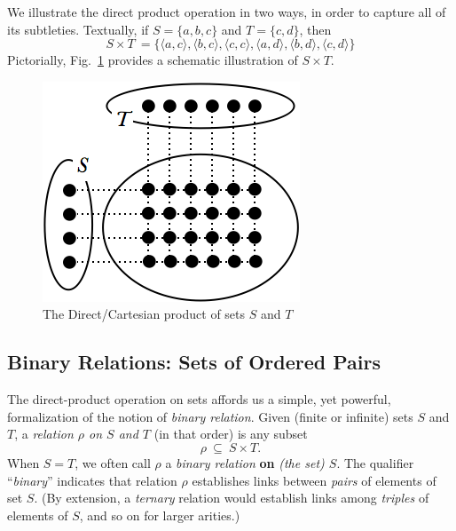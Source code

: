 \smallskip

We illustrate the direct product operation in two ways, in order to capture all of its subtleties. Textually, if $S = \{a,b,c\}$ and $T = \{c,d\}$, then
\[ S \times T \ =  \{
\langle a,c \rangle,
\langle b,c \rangle,
\langle c,c \rangle,
\langle a,d \rangle,
\langle b,d \rangle,
\langle c,d \rangle\}
\]
Pictorially, Fig.~\ref{fig:cartesianproduct} provides a schematic illustration of $S \times T$.
\begin{figure}[htb]
\begin{center}
        \includegraphics[scale=0.4]{FiguresMaths/cartesianProduct}
        \caption{The Direct/Cartesian product of sets $S$ and $T$}
        \label{fig:cartesianproduct}
\end{center}
\end{figure}

\subsection{Binary Relations: Sets of Ordered Pairs}
\label{sec:relation}

  
The direct-product operation on sets affords us a simple, yet powerful, formalization of the  notion of {\em binary relation}.  Given (finite or infinite) sets $S$ and $T$, a {\it relation $\rho$ on $S$ and $T$} (in that order) is any subset
\[ \rho \ \subseteq \ S \times T. \]
When $S = T$, we often call $\rho$ a {\em binary relation} {\bf on} {\em (the set) $S$}.  The qualifier ``{\em binary}'' indicates that relation $\rho$ establishes links between {\em pairs} of elements of set $S$.  (By extension, a {\em ternary} relation would establish links among {\em triples} of elements of $S$, and so on for larger arities.) 

\smallskip

